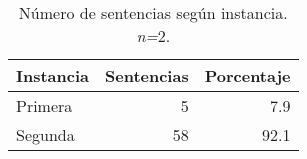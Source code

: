 \begin{table}[!htbp]
\centering
\caption{Número de sentencias según instancia. \textit{n=}2.} 
\label{tab:instancia}
\begin{tabular}{lrr}
  \hline
Instancia & Sentencias & Porcentaje \\ 
  \hline
Primera &  5 & 7.9 \\ 
  Segunda & 58 & 92.1 \\ 
   \hline
\end{tabular}
\end{table}
